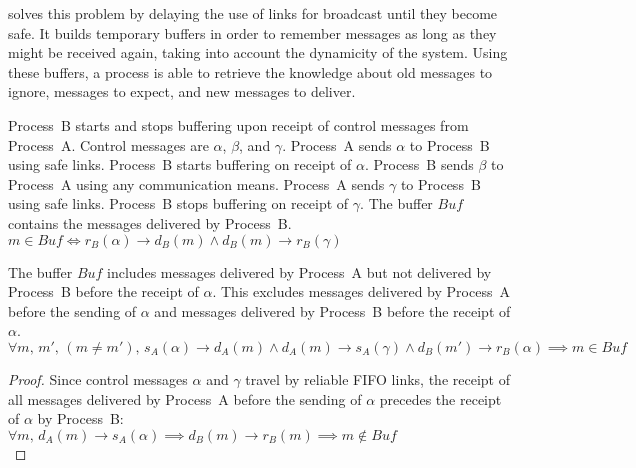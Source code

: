 
\RPCBROADCAST solves this problem by delaying the use of links for broadcast
until they become safe. It builds temporary buffers in order to remember
messages as long as they might be received again, taking into account the
dynamicity of the system. Using these buffers, a process is able to retrieve the
knowledge about old messages to ignore, messages to expect, and new messages to
deliver.

\begin{definition}
  Process~B starts and stops buffering upon receipt of control messages from
  Process~A. Control messages are $\alpha$, $\beta$, and $\gamma$. Process~A
  sends $\alpha$ to Process~B using safe links. Process~B starts buffering on
  receipt of $\alpha$. Process~B sends $\beta$ to Process~A using any
  communication means. Process~A sends $\gamma$ to Process~B using safe
  links. Process~B stops buffering on receipt of $\gamma$.
  The buffer $Buf$ contains the messages delivered by Process~B. \\
  $m \in Buf \Longleftrightarrow 
  r_B(\alpha) \rightarrow d_B(m) \wedge d_B(m) \rightarrow r_B(\gamma)$
\end{definition}

\begin{lemma}
  The buffer $Buf$ includes messages delivered by Process~A but not delivered by
  Process~B before the receipt of $\alpha$. This excludes messages delivered by
  Process~A before the sending of $\alpha$ and messages delivered by Process~B
  before the receipt of $\alpha$.\\
  $\forall m,\,m',\,(m\neq m'),\,
  s_A(\alpha) \rightarrow d_A(m) \wedge
  d_A(m) \rightarrow s_A(\gamma) \wedge
  d_B(m') \rightarrow r_B(\alpha) \implies m \in Buf$
\end{lemma}

\begin{proof}
  Since control messages $\alpha$ and $\gamma$ travel by reliable FIFO links,
  the receipt of all messages delivered by Process~A before the sending of
  $\alpha$ precedes the receipt of $\alpha$ by Process~B:\\
  $\forall m,\, d_A(m) \rightarrow s_A(\alpha) \implies d_B(m) \rightarrow
  r_B(m) \implies m \not\in Buf$\\
\end{proof}

